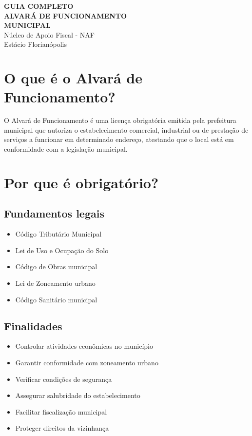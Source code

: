 \documentclass[12pt,a4paper]{article}
\begin{document}
\begin{center}
{\LARGE \textbf{GUIA COMPLETO}}\\[0.5cm]
{\Large \textbf{ALVARÁ DE FUNCIONAMENTO}}\\[0.3cm]
{\Large \textbf{MUNICIPAL}}\\[0.5cm]
{\large Núcleo de Apoio Fiscal - NAF}\\
{\large Estácio Florianópolis}\\[1cm]
\end{center}

\section{O que é o Alvará de Funcionamento?}

O Alvará de Funcionamento é uma licença obrigatória emitida pela prefeitura municipal que autoriza o estabelecimento comercial, industrial ou de prestação de serviços a funcionar em determinado endereço, atestando que o local está em conformidade com a legislação municipal.

\section{Por que é obrigatório?}

\subsection{Fundamentos legais}
\begin{itemize}
    \item Código Tributário Municipal
    \item Lei de Uso e Ocupação do Solo
    \item Código de Obras municipal
    \item Lei de Zoneamento urbano
    \item Código Sanitário municipal
\end{itemize}

\subsection{Finalidades}
\begin{itemize}
    \item Controlar atividades econômicas no município
    \item Garantir conformidade com zoneamento urbano
    \item Verificar condições de segurança
    \item Assegurar salubridade do estabelecimento
    \item Facilitar fiscalização municipal
    \item Proteger direitos da vizinhança
\end{itemize}
\end{document}
